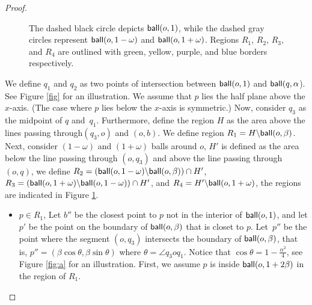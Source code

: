 \documentclass[11pt]{article}
\newcommand{\ball}{{\sf ball}}
\begin{document}
\begin{proof}
\begin{figure}[h]

     \centering
     \tikzIX
      \caption{ \footnotesize The dashed black circle depicts $\ball(o,1)$, while the dashed gray circles represent $\ball(o, 1-\omega)$ and $\ball(o,1+\omega)$. Regions $R_1$, $R_2$, $R_3$, and $R_4$ are outlined with green, yellow, purple, and blue borders respectively.}
        \label{fig:regions}  
\end{figure}
We define $q_1$ and $q_2$ as two points of intersection between $\ball(o,1)$ and $\ball (q, \alpha$). See Figure \ref{fig} for an illustration. We assume that $p$ lies the half plane above the $x$-axis. (The case where $p$ lies below the $x$-axis is symmetric.) Now, consider $q_3$ as the midpoint of $q$ and~$q_1$. Furthermore, define the region $H$ as the area above the lines passing through$(q_3 , o)$ and $(o,b)$. We define region $R_1 = H \backslash \ball(o , \beta)$.  Next, consider $(1-\omega)$ and $(1+ \omega)$ balls around $o$, $H'$ is defined as the area below the line passing through $(o, q_3)$ and above the line passing through $(o, q)$, we define $R_2 = (\ball(o, 1-\omega)\backslash \ball (o,\beta))\cap H'$, $R_3= (\ball(o, 1+\omega)\backslash \ball (o, 1-\omega))\cap H'$, and $ R_4=  H'\backslash \ball ( o , 1+ \omega)$, the regions are indicated in Figure \ref{fig:regions}.
\begin{itemize}
   \item $p \in R_1$, Let $b''$ be the closest point to $p$ not in the interior of $\ball(o,1)$, and let $p'$ be the point on the boundary of $\ball(o , \beta)$ that is closet to $p$. Let~$p''$ be the point where the segment $(o,q_3)$ intersects the boundary of $\ball(o,\beta)$, that is, $p''= (\beta \cos{\theta} , \beta \sin {\theta})$ where $\theta=\angle q_3 o q_1$. Notice that $\cos{\theta} = 1 - \frac{\alpha^2}{4}$, see Figure \ref{fig:a} for an illustration. First, we assume $p$ is inside $\ball(o,1+2\beta)$ in the region of $R_1$.


\end{itemize}
\end{proof}
\end{document}
